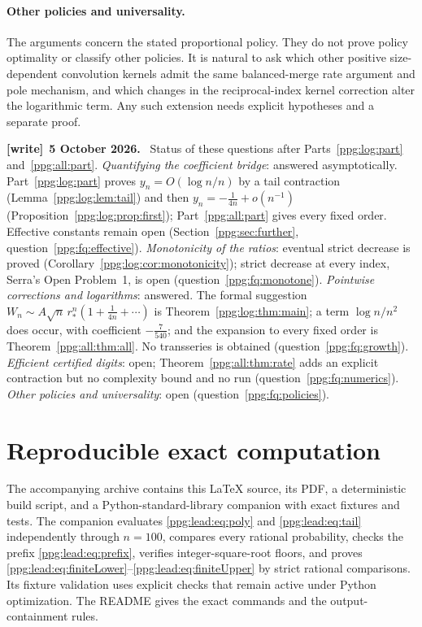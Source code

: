\documentclass[11pt,letterpaper]{article}
\theoremstyle{remark}\newtheorem{remark}[theorem]{Remark}
\numberwithin{equation}{section}
\newenvironment{writenote}[1][]{\par\smallskip\begingroup\small
 \noindent\textbf{[write]}\if\relax\detokenize{#1}\relax\else~\textbf{#1.}\fi\ }%
 {\par\endgroup\smallskip}
\begin{document}
\paragraph{Other policies and universality.}
The arguments concern the stated proportional policy. They do not prove policy optimality or classify other policies. It is natural to ask which other positive size-dependent convolution kernels admit the same balanced-merge rate argument and pole mechanism, and which changes in the reciprocal-index kernel correction alter the logarithmic term. Any such extension needs explicit hypotheses and a separate proof.
\begin{writenote}[5 October 2026]
Status of these questions after Parts~\ref{ppg:log:part} and~\ref{ppg:all:part}. \emph{Quantifying the coefficient bridge}: answered asymptotically. Part~\ref{ppg:log:part} proves $y_n=O(\log n/n)$ by a tail contraction (Lemma~\ref{ppg:log:lem:tail}) and then $y_n=-\frac1{4n}+o(n^{-1})$ (Proposition~\ref{ppg:log:prop:first}); Part~\ref{ppg:all:part} gives every fixed order. Effective constants remain open (Section~\ref{ppg:sec:further}, question~\ref{ppg:fq:effective}). \emph{Monotonicity of the ratios}: eventual strict decrease is proved (Corollary~\ref{ppg:log:cor:monotonicity}); strict decrease at every index, Serra's Open Problem~1, is open (question~\ref{ppg:fq:monotone}). \emph{Pointwise corrections and logarithms}: answered. The formal suggestion $W_n\sim A\sqrt n\,r_*^n(1+\frac1{4n}+\cdots)$ is Theorem~\ref{ppg:log:thm:main}; a term $\log n/n^2$ does occur, with coefficient $-\frac7{540}$; and the expansion to every fixed order is Theorem~\ref{ppg:all:thm:all}. No transseries is obtained (question~\ref{ppg:fq:growth}). \emph{Efficient certified digits}: open; Theorem~\ref{ppg:all:thm:rate} adds an explicit contraction but no complexity bound and no run (question~\ref{ppg:fq:numerics}). \emph{Other policies and universality}: open (question~\ref{ppg:fq:policies}).
\end{writenote}

\section{Reproducible exact computation}\label{ppg:lead:app:reproduce}
The accompanying archive contains this LaTeX source, its PDF, a deterministic build script, and a Python-standard-library companion with exact fixtures and tests. The companion evaluates \eqref{ppg:lead:eq:poly} and \eqref{ppg:lead:eq:tail} independently through $n=100$, compares every rational probability, checks the prefix \eqref{ppg:lead:eq:prefix}, verifies integer-square-root floors, and proves \eqref{ppg:lead:eq:finiteLower}--\eqref{ppg:lead:eq:finiteUpper} by strict rational comparisons. Its fixture validation uses explicit checks that remain active under Python optimization. The README gives the exact commands and the output-containment rules.
\end{document}
